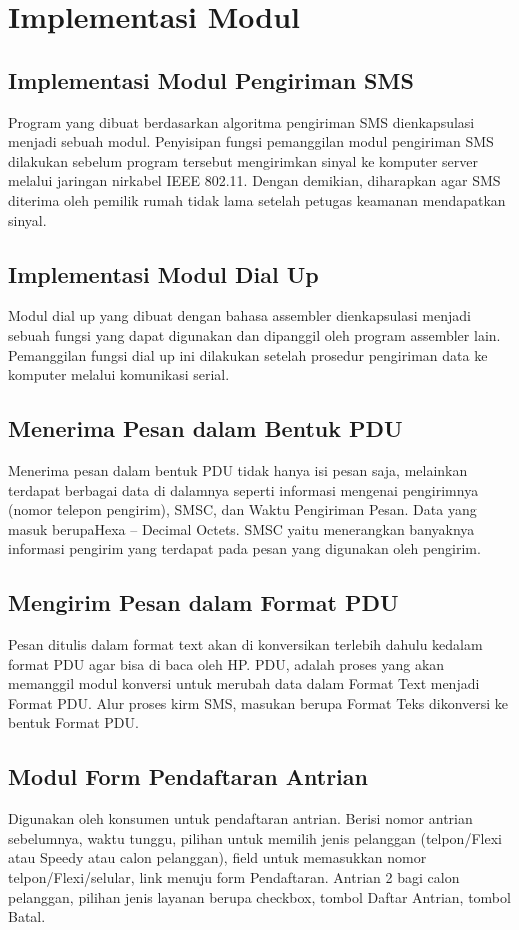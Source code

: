 \documentclass[12pt,a4paper]{article}
\begin{document}
\section{Implementasi Modul}
\subsection{Implementasi Modul Pengiriman SMS}
Program yang dibuat berdasarkan algoritma pengiriman SMS dienkapsulasi menjadi sebuah modul. Penyisipan fungsi pemanggilan modul pengiriman SMS dilakukan sebelum program tersebut mengirimkan sinyal ke komputer server melalui jaringan nirkabel IEEE 802.11. Dengan demikian, diharapkan agar SMS diterima oleh pemilik rumah tidak lama setelah petugas keamanan mendapatkan sinyal. 
\subsection{Implementasi Modul Dial Up}
Modul dial up yang dibuat dengan bahasa assembler dienkapsulasi menjadi sebuah fungsi yang dapat digunakan dan dipanggil oleh program assembler lain. Pemanggilan fungsi dial up ini dilakukan setelah prosedur pengiriman data ke komputer melalui komunikasi serial.
\subsection{Menerima Pesan dalam Bentuk PDU}
Menerima pesan dalam bentuk PDU tidak hanya isi pesan saja, melainkan terdapat berbagai data di dalamnya seperti informasi mengenai pengirimnya (nomor telepon pengirim), SMSC, dan Waktu Pengiriman Pesan. Data yang masuk berupaHexa – Decimal Octets. SMSC yaitu menerangkan banyaknya informasi pengirim yang terdapat pada pesan yang digunakan oleh pengirim.
\subsection{Mengirim Pesan dalam Format PDU}
Pesan ditulis dalam format text akan di konversikan terlebih dahulu kedalam format PDU agar bisa di baca oleh HP. PDU, adalah proses yang akan memanggil modul konversi untuk merubah data dalam Format Text menjadi Format PDU.  Alur proses kirm SMS, masukan berupa Format Teks dikonversi ke bentuk Format PDU.
\subsection{Modul Form Pendaftaran Antrian}
Digunakan oleh konsumen untuk pendaftaran antrian. Berisi nomor antrian sebelumnya, waktu tunggu, pilihan untuk memilih jenis pelanggan (telpon/Flexi atau Speedy atau calon pelanggan), field untuk memasukkan nomor telpon/Flexi/selular, link menuju form Pendaftaran. Antrian 2 bagi calon pelanggan, pilihan jenis layanan berupa checkbox, tombol Daftar Antrian, tombol Batal.
\end{document}
